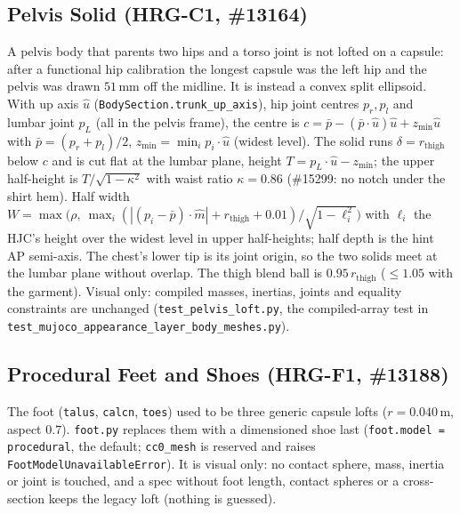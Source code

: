 \subsection{Pelvis Solid (HRG-C1, \#13164)}
A pelvis body that parents two hips and a torso joint is not lofted on a
capsule: after a functional hip calibration the longest capsule was the left
hip and the pelvis was drawn $51$\,mm off the midline. It is instead a convex
split ellipsoid. With up axis $\hat u$ (\texttt{BodySection.trunk\_up\_axis}),
hip joint centres $p_r,p_l$ and lumbar joint $p_L$ (all in the pelvis frame),
the centre is $c = \bar p - (\bar p\!\cdot\!\hat u)\hat u + z_{\min}\hat u$ with
$\bar p=(p_r+p_l)/2$, $z_{\min}=\min_i p_i\!\cdot\!\hat u$ (widest level). The
solid runs $\delta=r_{\mathrm{thigh}}$ below $c$ and is cut flat at the lumbar
plane, height $T = p_L\!\cdot\!\hat u - z_{\min}$; the upper half-height is
$T/\sqrt{1-\kappa^2}$ with waist ratio $\kappa=0.86$ (\#15299: no notch under
the shirt hem). Half width
$W=\max\bigl(\rho,\ \max_i (|(p_i-\bar p)\!\cdot\!\hat m| + r_{\mathrm{thigh}} + 0.01)
/\sqrt{1-\ell_i^2}\bigr)$ with $\ell_i$ the HJC's height over the widest level
in upper half-heights; half depth is the hint AP semi-axis. The chest's lower
tip is its joint origin, so the two solids meet at the lumbar plane without
overlap. The thigh blend ball is $0.95\,r_{\mathrm{thigh}}$ ($\le1.05$ with the
garment). Visual only: compiled masses, inertias, joints and equality
constraints are unchanged (\texttt{test\_pelvis\_loft.py}, the compiled-array
test in \texttt{test\_mujoco\_appearance\_layer\_body\_meshes.py}).

\subsection{Procedural Feet and Shoes (HRG-F1, \#13188)}
The foot (\texttt{talus}, \texttt{calcn}, \texttt{toes}) used to be three
generic capsule lofts ($r=0.040$\,m, aspect $0.7$). \texttt{foot.py} replaces
them with a dimensioned shoe last (\texttt{foot.model = procedural}, the
default; \texttt{cc0\_mesh} is reserved and raises
\texttt{FootModelUnavailableError}). It is visual only: no contact sphere, mass,
inertia or joint is touched, and a spec without foot length, contact spheres or
a cross-section keeps the legacy loft (nothing is guessed).

